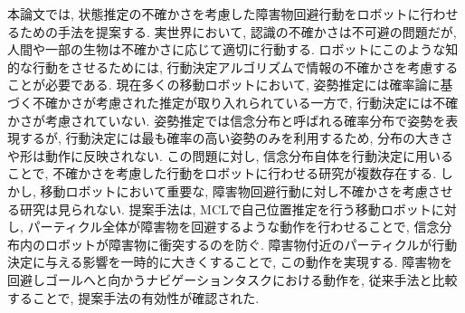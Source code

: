 \begin{jabstract}
本論文では, 状態推定の不確かさを考慮した障害物回避行動をロボットに行わせるための手法を提案する. 
実世界において, 認識の不確かさは不可避の問題だが, 人間や一部の生物は不確かさに応じて適切に行動する. 
ロボットにこのような知的な行動をさせるためには, 行動決定アルゴリズムで情報の不確かさを考慮することが必要である. 
現在多くの移動ロボットにおいて, 姿勢推定には確率論に基づく不確かさが考慮された推定が取り入れられている一方で, 行動決定には不確かさが考慮されていない. 
姿勢推定では信念分布と呼ばれる確率分布で姿勢を表現するが, 行動決定には最も確率の高い姿勢のみを利用するため, 分布の大きさや形は動作に反映されない. 
この問題に対し, 信念分布自体を行動決定に用いることで, 不確かさを考慮した行動をロボットに行わせる研究が複数存在する. 
しかし, 移動ロボットにおいて重要な, 障害物回避行動に対し不確かさを考慮させる研究は見られない. 
提案手法は, MCLで自己位置推定を行う移動ロボットに対し, パーティクル全体が障害物を回避するような動作を行わせることで, 信念分布内のロボットが障害物に衝突するのを防ぐ. 
障害物付近のパーティクルが行動決定に与える影響を一時的に大きくすることで, この動作を実現する. 
障害物を回避しゴールへと向かうナビゲーションタスクにおける動作を, 従来手法と比較することで, 提案手法の有効性が確認された. 
\end{jabstract}

